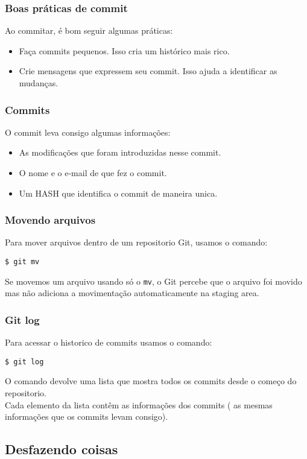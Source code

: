 \documentclass[brazil]{beamer}
\begin{document}
\begin{frame}[fragile]
  \frametitle{Boas práticas de commit}
  Ao commitar, é bom seguir algumas práticas:
  \begin{itemize}
    \item Faça commits pequenos. Isso cria um histórico mais rico.
    \item Crie mensagens que expressem seu commit. Isso ajuda a identificar as mudanças.
  \end{itemize}
\end{frame}

\begin{frame}[fragile]
  \frametitle{Commits}
  O commit leva consigo algumas informações:
  \begin{itemize}
    \item As modificações que foram introduzidas nesse commit.
    \item O nome e o e-mail de que fez o commit.
    \item Um HASH que identifica o commit de maneira unica.
  \end{itemize}
\end{frame}

\begin{frame}[fragile]
  \frametitle{Movendo arquivos}
  Para mover arquivos dentro de um repositorio Git, usamos o comando: \\
  \begin{block}{}
    \verb#$ git mv#
  \end{block}
  \pause
  Se movemos um arquivo usando só o \verb#mv#, o Git percebe que o arquivo foi movido mas não
  adiciona a movimentação automaticamente na staging area.
\end{frame}

\begin{frame}[fragile]
  \frametitle{Git log}
  Para acessar o historico de commits usamos o comando:
  \begin{block}{}
    \verb#$ git log#
  \end{block}
  \pause
  O comando devolve uma lista que mostra todos os commits desde o começo do repositorio. \\
  Cada elemento da lista contêm as informações dos commits ( as mesmas informações que os commits levam 
  consigo).
\end{frame}

\subsection{Desfazendo coisas}
\end{document}
